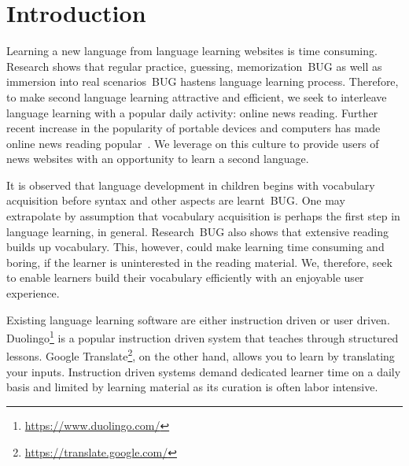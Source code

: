 \section{Introduction}
Learning a new language from language learning websites is 
time consuming. Research shows that regular practice, guessing, 
memorization~\cite{rubin91}BUG as well as immersion into real 
scenarios~\cite{naiman78}BUG hastens language learning process. 
Therefore, to make second language learning 
attractive and efficient, we seek to interleave language learning 
with a popular daily activity: online news reading.
Further recent increase in the popularity of 
portable devices and computers has made online news reading 
popular~\cite{yarlh2012}. We leverage on this culture to provide 
users of news websites with an opportunity to learn a second language.

It is observed that language development in children begins with 
vocabulary acquisition before syntax and other aspects are learnt~\cite{}BUG. 
One may extrapolate by assumption that vocabulary acquisition is perhaps 
the first step in language learning, in general. Research~\cite{}BUG also 
shows that extensive reading builds up vocabulary. This, however, could 
make learning time consuming and boring, if the learner is uninterested 
in the reading material. We, therefore, seek to enable learners build 
their vocabulary efficiently with an enjoyable user experience.


Existing language learning software are either instruction driven or user driven. 
Duolingo\footnote{\url{https://www.duolingo.com/}} is a popular instruction driven system 
that teaches through structured lessons. Google Translate\footnote{\url{https://translate.google.com/}}, 
on the other hand, allows you to learn by translating your inputs. Instruction 
driven systems demand dedicated learner time on a daily basis and
limited by learning material as its curation is often labor intensive.


